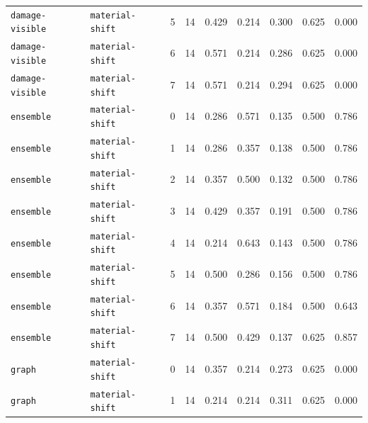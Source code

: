 \documentclass{article}
\begin{document}
\begin{center}
\begin{tabular}{llccccccc}
\texttt{damage-visible} & \texttt{material-shift} & 5 & 14 & 0.429 & 0.214 & 0.300 & 0.625 & 0.000 \\
\texttt{damage-visible} & \texttt{material-shift} & 6 & 14 & 0.571 & 0.214 & 0.286 & 0.625 & 0.000 \\
\texttt{damage-visible} & \texttt{material-shift} & 7 & 14 & 0.571 & 0.214 & 0.294 & 0.625 & 0.000 \\
\texttt{ensemble} & \texttt{material-shift} & 0 & 14 & 0.286 & 0.571 & 0.135 & 0.500 & 0.786 \\
\texttt{ensemble} & \texttt{material-shift} & 1 & 14 & 0.286 & 0.357 & 0.138 & 0.500 & 0.786 \\
\texttt{ensemble} & \texttt{material-shift} & 2 & 14 & 0.357 & 0.500 & 0.132 & 0.500 & 0.786 \\
\texttt{ensemble} & \texttt{material-shift} & 3 & 14 & 0.429 & 0.357 & 0.191 & 0.500 & 0.786 \\
\texttt{ensemble} & \texttt{material-shift} & 4 & 14 & 0.214 & 0.643 & 0.143 & 0.500 & 0.786 \\
\texttt{ensemble} & \texttt{material-shift} & 5 & 14 & 0.500 & 0.286 & 0.156 & 0.500 & 0.786 \\
\texttt{ensemble} & \texttt{material-shift} & 6 & 14 & 0.357 & 0.571 & 0.184 & 0.500 & 0.643 \\
\texttt{ensemble} & \texttt{material-shift} & 7 & 14 & 0.500 & 0.429 & 0.137 & 0.625 & 0.857 \\
\texttt{graph} & \texttt{material-shift} & 0 & 14 & 0.357 & 0.214 & 0.273 & 0.625 & 0.000 \\
\texttt{graph} & \texttt{material-shift} & 1 & 14 & 0.214 & 0.214 & 0.311 & 0.625 & 0.000 \\
\bottomrule
\end{tabular}
\end{center}
\end{document}
